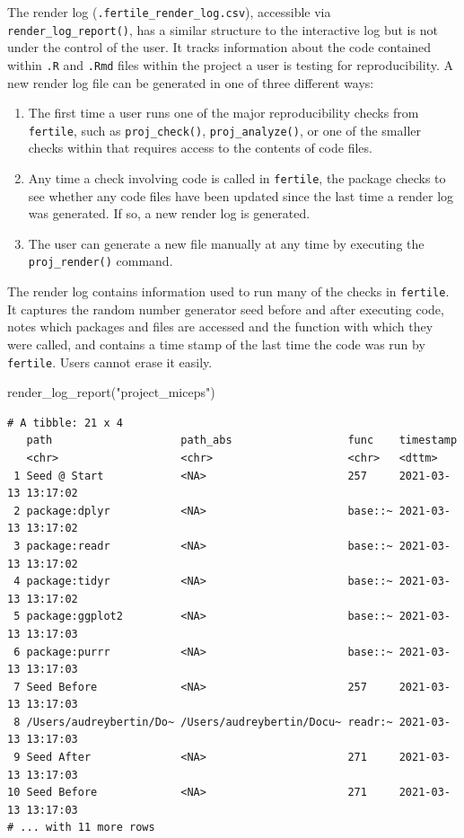 \documentclass[12pt,twoside]{reedthesis}
\newenvironment{Shaded}{\begin{snugshade}}{\end{snugshade}}
\newcommand{\FunctionTok}[1]{\textcolor[rgb]{0.00,0.00,0.00}{#1}}
\newcommand{\NormalTok}[1]{#1}
\newcommand{\StringTok}[1]{\textcolor[rgb]{0.31,0.60,0.02}{#1}}
\begin{document}
The render log (\texttt{.fertile\_render\_log.csv}), accessible via \texttt{render\_log\_report()}, has a similar structure to the interactive log but is not under the control of the user. It tracks information about the code contained within \texttt{.R} and \texttt{.Rmd} files within the project a user is testing for reproducibility. A new render log file can be generated in one of three different ways:
\begin{enumerate}
\def\labelenumi{\arabic{enumi}.}
\item
  The first time a user runs one of the major reproducibility checks from \texttt{fertile}, such as \texttt{proj\_check()}, \texttt{proj\_analyze()}, or one of the smaller checks within that requires access to the contents of code files.
\item
  Any time a check involving code is called in \texttt{fertile}, the package checks to see whether any code files have been updated since the last time a render log was generated. If so, a new render log is generated.
\item
  The user can generate a new file manually at any time by executing the \texttt{proj\_render()} command.
\end{enumerate}
The render log contains information used to run many of the checks in \texttt{fertile}. It captures the random number generator seed before and after executing code, notes which packages and files are accessed and the function with which they were called, and contains a time stamp of the last time the code was run by \texttt{fertile}. Users cannot erase it easily.
\begin{Shaded}
\begin{Highlighting}[]
\FunctionTok{render\_log\_report}\NormalTok{(}\StringTok{"project\_miceps"}\NormalTok{)}
\end{Highlighting}
\end{Shaded}
\footnotesize
\begin{verbatim}
# A tibble: 21 x 4
   path                    path_abs                  func    timestamp          
   <chr>                   <chr>                     <chr>   <dttm>             
 1 Seed @ Start            <NA>                      257     2021-03-13 13:17:02
 2 package:dplyr           <NA>                      base::~ 2021-03-13 13:17:02
 3 package:readr           <NA>                      base::~ 2021-03-13 13:17:02
 4 package:tidyr           <NA>                      base::~ 2021-03-13 13:17:02
 5 package:ggplot2         <NA>                      base::~ 2021-03-13 13:17:03
 6 package:purrr           <NA>                      base::~ 2021-03-13 13:17:03
 7 Seed Before             <NA>                      257     2021-03-13 13:17:03
 8 /Users/audreybertin/Do~ /Users/audreybertin/Docu~ readr:~ 2021-03-13 13:17:03
 9 Seed After              <NA>                      271     2021-03-13 13:17:03
10 Seed Before             <NA>                      271     2021-03-13 13:17:03
# ... with 11 more rows
\end{verbatim}
\normalsize
\end{document}
